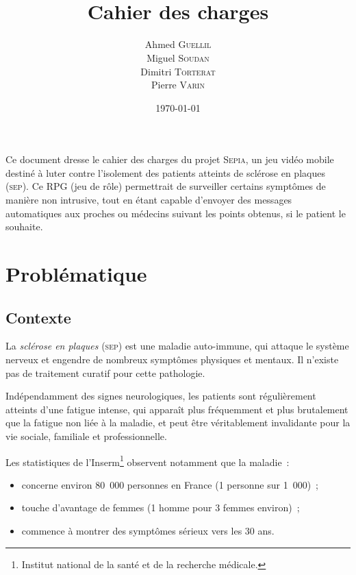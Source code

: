 \documentclass[a4paper,12pt,francais]{article}
\title{\Sepia\\Cahier des charges}
\author{Ahmed \textsc{Guellil}\\
  Miguel \textsc{Soudan}\\
  Dimitri \textsc{Torterat}\\
  Pierre \textsc{Varin}
}
\date{\today} %
\newcommand{\SEP}{\textsc{sep}\xspace}
\newcommand{\Sepia}{\textsc{Sepia}\xspace}
\begin{document}
\renewcommand{\labelitemi}{-}
\renewcommand{\labelitemii}{\tiny{+}}
\renewcommand{\contentsname}{Sommaire}

\maketitle

Ce document dresse le cahier des charges du projet \Sepia, un jeu vidéo mobile destiné à luter contre l’isolement des patients atteints de sclérose en plaques (\SEP). Ce RPG (jeu de rôle) permettrait de surveiller certains symptômes de manière non intrusive, tout en étant capable d’envoyer des messages automatiques aux proches ou médecins suivant les points obtenus, si le patient le souhaite.


\newpage
\tableofcontents
\newpage

\section{Problématique}
\subsection{Contexte}

La \emph{sclérose en plaques} (\SEP{}) est une maladie auto-immune, qui attaque le système nerveux et engendre de nombreux symptômes physiques et mentaux. Il n’existe pas de traitement curatif pour cette pathologie.

Indépendamment des signes neurologiques, les patients sont régulièrement atteints d’une fatigue intense, qui apparaît plus fréquemment et plus brutalement que la fatigue non liée à la maladie, et peut être véritablement invalidante pour la vie sociale, familiale et professionnelle.

Les statistiques de l’Inserm\footnote{Institut national de la santé et de la recherche médicale.} observent notamment que la maladie~:
\begin{itemize}
\item concerne environ 80~000 personnes en France (1 personne sur 1~000)~;
\item touche d’avantage de femmes (1 homme pour 3 femmes environ)~;
\item commence à montrer des symptômes sérieux vers les 30 ans.
\end{itemize}
\end{document}
